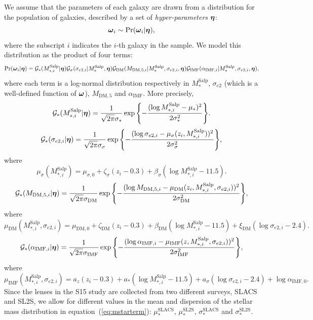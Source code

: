 \documentclass[usenatbib]{mnras}
\newcommand{\boldsymbol}[1]{\mbox{\boldmath{${#1}$}}}
\def\mdm{M_{\mathrm{DM}}}
\def\msalp{M_*^{\mathrm{Salp}}}
\def\aimf{\alpha_{\mathrm{IMF}}}
\def\mdm{M_{\mathrm{DM},5}}
\def\sigmaee{\sigma_{e2}}
\def\pr{{\rm Pr}}
\def\hyperp{\boldsymbol{\eta}}
\def\indpar{\boldsymbol{\omega}}
\def\indpari{\boldsymbol{\omega}_i}
\def\msalpi{M_{*,i}^{\mathrm{Salp}}}
\def\aimfi{\alpha_{\mathrm{IMF},i}}
\def\mdmi{M_{\mathrm{DM},5,i}}
\def\sigmaeei{\sigma_{e2,i}}
\def\Eref#1{equation~(\ref{#1})\xspace}
\begin{document}
We assume that the parameters of each galaxy are drawn from a
distribution for the population of galaxies, described by a set of
{\em hyper-parameters} $\hyperp$:
\begin{equation}
\indpari \sim \pr(\indpari | \hyperp),
\end{equation}
where the subscript $i$ indicates the $i$-th galaxy in the sample.
We model this distribution as the product of four terms:
\begin{equation}\label{eq:hyperp}
\pr(\indpari | \hyperp) = \mathcal{G}_*(\msalpi|\hyperp) \mathcal{G}_\sigma(\sigmaeei|\msalp, \hyperp) \mathcal{G}_{\mathrm{DM}}(\mdmi|\msalp,\sigmaeei,\hyperp) \mathcal{G}_{\mathrm{IMF}}(\aimfi|\msalp,\sigmaeei,\hyperp),
\end{equation}
where each term is a log-normal distribution respectively in $\msalp$, $\sigmaee$ (which is a well-defined function of $\indpar$), $\mdm$ and $\aimf$.
More precisely,
\begin{equation}\label{eq:mstarterm}
\mathcal{G}_*(\msalpi|\hyperp) = \frac{1}{\sqrt{2\pi}\sigma_*}\exp{\left\{-\frac{(\log{\msalpi} - \mu_*)^2}{2\sigma_*^2}\right\}}.
\end{equation}
%
\begin{equation}
\mathcal{G}_*(\sigmaeei|\hyperp) = \frac{1}{\sqrt{2\pi}\sigma_\sigma}\exp{\left\{-\frac{(\log{\sigmaeei} - \mu_\sigma(z_i, \msalpi))^2}{2\sigma_\sigma^2}\right\}},
\end{equation}
where
\begin{equation}
\mu_\sigma(\msalpi) = \mu_{\sigma,0} + \zeta_\sigma(z_i - 0.3) + \beta_\sigma(\log{\msalpi} - 11.5).
\end{equation}
%
\begin{equation}
\mathcal{G}_*(\mdmi|\hyperp) = \frac{1}{\sqrt{2\pi}\sigma_{\mathrm{DM}}}\exp{\left\{-\frac{(\log{\mdmi} - \mu_{\mathrm{DM}}(z_i, \msalpi, \sigmaeei))^2}{2\sigma_{\mathrm{DM}}^2}\right\}},
\end{equation}
where
\begin{equation}
\mu_{\mathrm{DM}}(\msalpi, \sigmaeei) = \mu_{\mathrm{DM},0} + \zeta_{\mathrm{DM}}(z_i - 0.3) + \beta_{\mathrm{DM}}(\log{\msalpi} - 11.5) + \xi_{\mathrm{DM}}(\log{\sigmaeei} - 2.4).
\end{equation}
%
\begin{equation}
\mathcal{G}_*(\aimfi|\hyperp) = \frac{1}{\sqrt{2\pi}\sigma_{\mathrm{IMF}}}\exp{\left\{-\frac{(\log{\aimfi} - \mu_{\mathrm{IMF}}(z, \msalpi, \sigmaeei))^2}{2\sigma_{\mathrm{IMF}}^2}\right\}},
\end{equation}
where
\begin{equation}
\mu_{\mathrm{IMF}}(\msalpi, \sigmaeei) = a_z(z_i - 0.3) + a_*(\log{\msalpi} - 11.5) + a_\sigma(\log{\sigmaeei} - 2.4) + \log{\alpha_{\mathrm{IMF},0}}.
\end{equation}
Since the lenses in the S15 study are collected from two different
surveys, SLACS and SL2S, we allow for different values in the mean and
dispersion of the stellar mass distribution in \Eref{eq:mstarterm}: $\mu_*^{\mathrm{SLACS}}$, $\mu_*^{\mathrm{SL2S}}$, $\sigma_*^{\mathrm{SLACS}}$ and $\sigma_*^{\mathrm{SL2S}}$.
\end{document}
